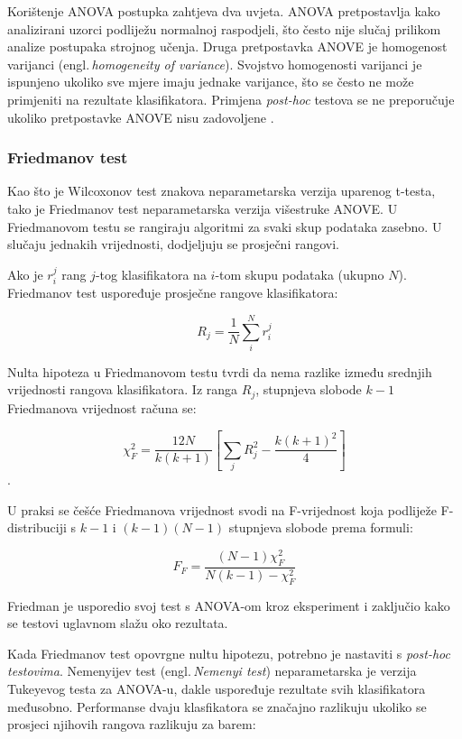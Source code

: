 Korištenje ANOVA postupka zahtjeva dva uvjeta. ANOVA pretpostavlja kako analizirani uzorci podliježu normalnoj raspodjeli, što često nije slučaj prilikom analize postupaka strojnog učenja. Druga pretpostavka ANOVE je homogenost varijanci (engl.\,\textit{homogeneity of variance}). Svojstvo homogenosti varijanci je ispunjeno ukoliko sve mjere imaju jednake varijance, što se često ne može primjeniti na rezultate klasifikatora. Primjena \textit{post-hoc} testova se ne preporučuje ukoliko pretpostavke ANOVE nisu zadovoljene \citep{zar1974multiple}.

\subsubsection{Friedmanov test}

Kao što je Wilcoxonov test znakova neparametarska verzija uparenog t-testa, tako je Friedmanov test \citep{friedman1937use} neparametarska verzija višestruke ANOVE. U Friedmanovom testu se rangiraju algoritmi za svaki skup podataka zasebno. U slučaju jednakih vrijednosti, dodjeljuju se prosječni rangovi.

Ako je $r_{i}^{j}$ rang $j$-tog klasifikatora na $i$-tom skupu podataka (ukupno $N$). Friedmanov test uspoređuje prosječne rangove klasifikatora:

$$
R_j = \frac{1}{N} \sum_{i}^{N}r_{i}^{j}
$$

Nulta hipoteza u Friedmanovom testu tvrdi da nema razlike između srednjih vrijednosti rangova klasifikatora. Iz ranga $R_j$, stupnjeva slobode $k-1$ Friedmanova vrijednost računa se:

$$
\chi_{F}^{2} = \frac{12N}{k(k+1)}\left[\sum_j R_{j}^{2}-\frac{k(k+1)^2}{4}\right]
$$.

U praksi se češće Friedmanova vrijednost svodi na F-vrijednost koja podliježe F-distribuciji s $k-1$ i $(k-1)(N-1)$ stupnjeva slobode prema formuli:

$$
F_F = \frac{(N-1)\chi_{F}^{2}}{N(k-1)-\chi_{F}^{2}}
$$

Friedman je usporedio svoj test s ANOVA-om kroz eksperiment \citep{friedman1940comparison} i zaključio kako se testovi uglavnom slažu oko rezultata. 

Kada Friedmanov test opovrgne nultu hipotezu, potrebno je nastaviti s \textit{post-hoc testovima}. Nemenyijev test (engl.\,\textit{Nemenyi test}) \citep{nemenyi1963distribution} neparametarska je verzija Tukeyevog testa za ANOVA-u, dakle uspoređuje rezultate svih klasifikatora međusobno. Performanse dvaju klasfikatora se značajno razlikuju ukoliko se prosjeci njihovih rangova razlikuju za barem:

